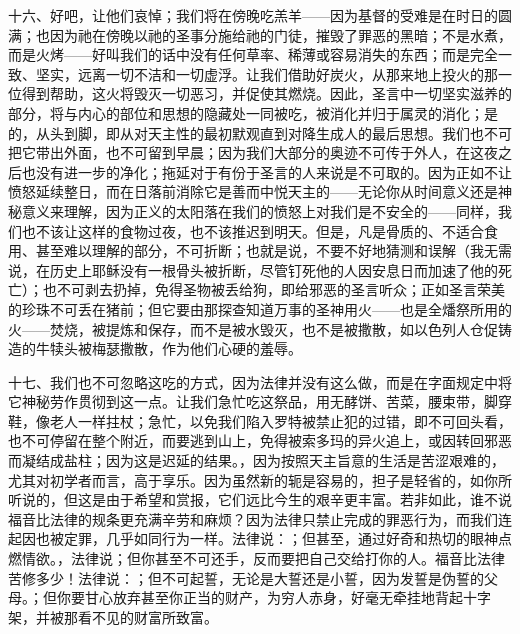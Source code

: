 十六、好吧，让他们哀悼；我们将在傍晚吃羔羊——因为基督的受难是在时日的圆满；也因为祂在傍晚以祂的圣事分施给祂的门徒，摧毁了罪恶的黑暗；不是水煮，而是火烤——好叫我们的话中没有任何草率、稀薄或容易消失的东西；而是完全一致、坚实，远离一切不洁和一切虚浮。让我们借助好炭火，从那来地上投火的那一位得到帮助，这火将毁灭一切恶习，并促使其燃烧。因此，圣言中一切坚实滋养的部分，将与内心的部位和思想的隐藏处一同被吃，被消化并归于属灵的消化；是的，从头到脚，即从对天主性的最初默观直到对降生成人的最后思想。我们也不可把它带出外面，也不可留到早晨；因为我们大部分的奥迹不可传于外人，在这夜之后也没有进一步的净化；拖延对于有份于圣言的人来说是不可取的。因为正如不让愤怒延续整日，而在日落前消除它是善而中悦天主的——无论你从时间意义还是神秘意义来理解，因为正义的太阳落在我们的愤怒上对我们是不安全的——同样，我们也不该让这样的食物过夜，也不该推迟到明天。但是，凡是骨质的、不适合食用、甚至难以理解的部分，不可折断；也就是说，不要不好地猜测和误解（我无需说，在历史上耶稣没有一根骨头被折断，尽管钉死他的人因安息日而加速了他的死亡）；也不可剥去扔掉，免得圣物被丢给狗，即给邪恶的圣言听众；正如圣言荣美的珍珠不可丢在猪前；但它要由那探查知道万事的圣神用火——也是全燔祭所用的火——焚烧，被提炼和保存，而不是被水毁灭，也不是被撒散，如以色列人仓促铸造的牛犊头被梅瑟撒散，作为他们心硬的羞辱。\par

十七、我们也不可忽略这吃的方式，因为法律并没有这么做，而是在字面规定中将它神秘劳作贯彻到这一点。让我们急忙吃这祭品，用无酵饼、苦菜，腰束带，脚穿鞋，像老人一样拄杖；急忙，以免我们陷入罗特被禁止犯的过错，即不可回头看，也不可停留在整个附近，而要逃到山上，免得被索多玛的异火追上，或因转回邪恶而凝结成盐柱；因为这是迟延的结果。，因为按照天主旨意的生活是苦涩艰难的，尤其对初学者而言，高于享乐。因为虽然新的轭是容易的，担子是轻省的，如你所听说的，但这是由于希望和赏报，它们远比今生的艰辛更丰富。若非如此，谁不说福音比法律的规条更充满辛劳和麻烦？因为法律只禁止完成的罪恶行为，而我们连起因也被定罪，几乎如同行为一样。法律说：；但甚至，通过好奇和热切的眼神点燃情欲。，法律说；但你甚至不可还手，反而要把自己交给打你的人。福音比法律苦修多少！法律说：；但不可起誓，无论是大誓还是小誓，因为发誓是伪誓的父母。；但你要甘心放弃甚至你正当的财产，为穷人赤身，好毫无牵挂地背起十字架，并被那看不见的财富所致富。\par


